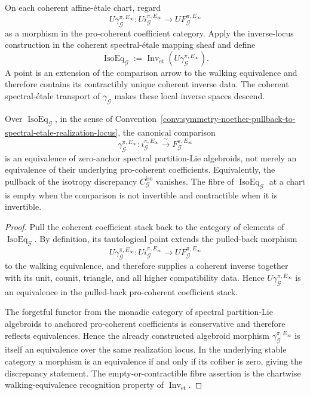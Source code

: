 \begin{construction}
\label{constr:symmetry-noether-isotropy-exactness-realization}
On each coherent affine-\'etale chart, regard
\[
U\gamma_{\mathcal G}^{\pi,E_\infty}:
Ui_{\mathcal G}^{\pi,E_\infty}
\longrightarrow
UF_{\mathcal G}^{\pi,E_\infty}
\]
as a morphism in the pro-coherent coefficient category.  Apply the inverse-locus
construction in the coherent spectral-\'etale mapping sheaf and define
\[
\boxed{
\operatorname{IsoEq}_{\mathcal G}
:=
\operatorname{Inv}_{\mathrm{\acute et}}
\left(U\gamma_{\mathcal G}^{\pi,E_\infty}\right).
}
\]
A point is an extension of the comparison arrow to the walking equivalence and
therefore contains its contractibly unique coherent inverse data.
The coherent spectral-\'etale transport of $\gamma_{\mathcal G}$ makes these local
inverse spaces descend.
\end{construction}

\begin{proposition}
\label{prop:symmetry-noether-universal-isotropy-exact-comparison}
Over $\operatorname{IsoEq}_{\mathcal G}$, in the sense of
Convention~\ref{conv:symmetry-noether-pullback-to-spectral-etale-realization-locus},
the canonical comparison
\[
\boxed{
\gamma_{\mathcal G}^{\pi,E_\infty}:
i_{\mathcal G}^{\pi,E_\infty}
\xrightarrow{\ \sim\ }
F_{\mathcal G}^{\pi,E_\infty}
}
\]
is an equivalence of zero-anchor spectral partition-Lie algebroids, not merely an
equivalence of their underlying pro-coherent coefficients.  Equivalently, the
pullback of the isotropy discrepancy $C_{\mathcal G}^{\mathrm{iso}}$ vanishes.  The
fibre of $\operatorname{IsoEq}_{\mathcal G}$ at a chart is empty when the
comparison is not invertible and contractible when it is invertible.
\end{proposition}

\begin{proof}
Pull the coherent coefficient stack back to the category of elements of
$\operatorname{IsoEq}_{\mathcal G}$.  By definition, its tautological point extends
the pulled-back morphism
\[
U\gamma_{\mathcal G}^{\pi,E_\infty}:
Ui_{\mathcal G}^{\pi,E_\infty}
\longrightarrow
UF_{\mathcal G}^{\pi,E_\infty}
\]
to the walking equivalence, and therefore supplies a coherent inverse together
with its unit, counit, triangle, and all higher compatibility data.  Hence
$U\gamma_{\mathcal G}^{\pi,E_\infty}$ is an equivalence in the pulled-back
pro-coherent coefficient stack.

The forgetful functor from the monadic category of spectral partition-Lie
algebroids to anchored pro-coherent coefficients is conservative and therefore
reflects equivalences.  Hence the already constructed algebroid morphism
$\gamma_{\mathcal G}^{\pi,E_\infty}$ is itself an equivalence over the same
realization locus.  In the underlying stable category a morphism is an equivalence
if and only if its cofiber is zero, giving the discrepancy statement.  The
empty-or-contractible fibre assertion is the chartwise walking-equivalence
recognition property of $\operatorname{Inv}_{\mathrm{\acute et}}$.
\end{proof}

